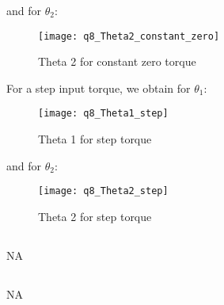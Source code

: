 	\newline and for $\theta _{2}$:\newline
	\begin{figure}[position = here]
		\begin{centering}
			\texttt{[image: q8\_Theta2\_constant\_zero]}\\
			\caption [WSpace]{Theta 2 for constant zero torque}
		\end{centering}
	\end{figure}
	\pagebreak
	\newline For a step input torque, we obtain for $\theta _{1}$:\newline
	\begin{figure}[position = here]
		\begin{centering}
			\texttt{[image: q8\_Theta1\_step]}\\
			\caption [WSpace]{Theta 1 for step torque}
		\end{centering}
	\end{figure}
	\newline and for $\theta _{2}$:\newline
	\begin{figure}[position = here]
		\begin{centering}
			\texttt{[image: q8\_Theta2\_step]}\\
			\caption [WSpace]{Theta 2 for step torque}
		\end{centering}
	\end{figure}
	\subsection{}
	NA\newline
	\subsection{}
	NA\newline

	
